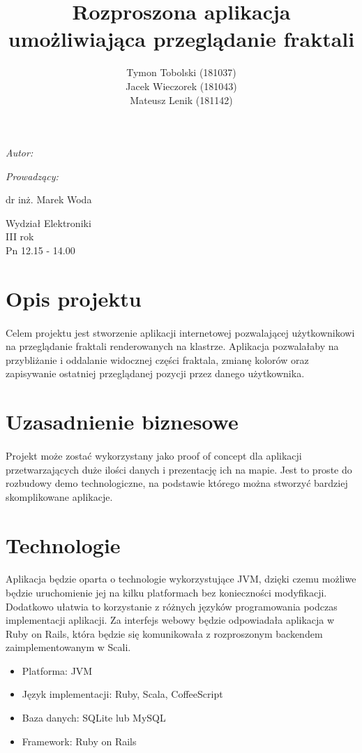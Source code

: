 \documentclass[wide,a4paper,titlepage,12pt]{article}
\title{Rozproszona aplikacja umożliwiająca przeglądanie fraktali}
\author{Tymon Tobolski {\small(181037)}\\ Jacek Wieczorek {\small(181043)} \\
Mateusz Lenik {\small(181142)}}
\makeatletter
\renewcommand{\maketitle}{
  \begin{titlepage}
    \begin{center}
      \vspace*{3cm}
      \LARGE \@title \par
      \vspace{2cm}
      \textit{\small Autor:}\par
      \normalsize \@author\par \normalsize
      \vspace{3cm}
      \textit{\small Prowadzący:}\par
      dr inż. Marek Woda \par
      \vspace{2cm}
      Wydział Elektroniki\\ III rok\\ Pn 12.15 - 14.00\par

    \end{center}
  \end{titlepage}
}
\makeatother
\begin{document}
\maketitle
\tableofcontents
\newpage

\section{Opis projektu}
\paragraph{}
Celem projektu jest stworzenie aplikacji internetowej pozwalającej użytkownikowi
na przeglądanie fraktali renderowanych na klastrze. Aplikacja
pozwalałaby na przybliżanie i oddalanie widocznej części fraktala, zmianę
kolorów oraz zapisywanie ostatniej przeglądanej pozycji przez danego
użytkownika.

\section{Uzasadnienie biznesowe}
\paragraph{}
Projekt może zostać wykorzystany jako proof of concept dla aplikacji
przetwarzających duże ilości danych i prezentację ich na mapie.
Jest to proste do rozbudowy demo technologiczne, na podstawie którego można
stworzyć bardziej skomplikowane aplikacje.

\section{Technologie}
\paragraph{}
Aplikacja będzie oparta o technologie wykorzystujące JVM, dzięki czemu możliwe
będzie uruchomienie jej na kilku platformach bez konieczności modyfikacji.
Dodatkowo ułatwia to korzystanie z różnych języków programowania podczas
implementacji aplikacji. Za interfejs webowy będzie odpowiadała aplikacja w Ruby
on Rails, która będzie się komunikowała z rozproszonym backendem
zaimplementowanym w Scali.

\begin{itemize}
  \item Platforma: JVM
  \item Język implementacji: Ruby, Scala, CoffeeScript
  \item Baza danych: SQLite lub MySQL
  \item Framework: Ruby on Rails
\end{itemize}
\end{document}
